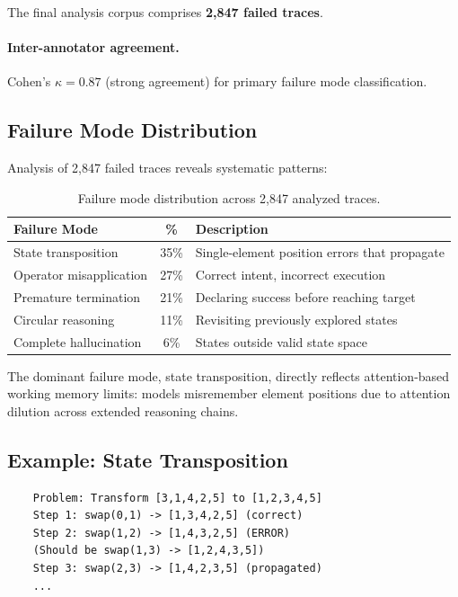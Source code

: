 \documentclass{article}
\theoremstyle{plain}
\theoremstyle{definition}
\theoremstyle{remark}
\begin{document}
The final analysis corpus comprises \textbf{2,847 failed traces}.

\paragraph{Inter-annotator agreement.} Cohen's $\kappa = 0.87$ (strong agreement) for primary failure mode classification.

\subsection{Failure Mode Distribution}

Analysis of 2,847 failed traces reveals systematic patterns:

\begin{table}[h]
	\centering
	\caption{Failure mode distribution across 2,847 analyzed traces.}
	\label{tab:failure_modes}
	\small
	\begin{tabular}{@{}lcp{5.5cm}@{}}
		\toprule
		\textbf{Failure Mode} & \textbf{\%} & \textbf{Description} \\
		\midrule
		State transposition & 35\% & Single-element position errors that propagate \\
		Operator misapplication & 27\% & Correct intent, incorrect execution \\
		Premature termination & 21\% & Declaring success before reaching target \\
		Circular reasoning & 11\% & Revisiting previously explored states \\
		Complete hallucination & 6\% & States outside valid state space \\
		\bottomrule
	\end{tabular}
\end{table}

The dominant failure mode, state transposition, directly reflects attention-based working memory limits: models misremember element positions due to attention dilution across extended reasoning chains.

\subsection{Example: State Transposition}

\begin{verbatim}
	Problem: Transform [3,1,4,2,5] to [1,2,3,4,5]
	Step 1: swap(0,1) -> [1,3,4,2,5] (correct)
	Step 2: swap(1,2) -> [1,4,3,2,5] (ERROR)
	(Should be swap(1,3) -> [1,2,4,3,5])
	Step 3: swap(2,3) -> [1,4,2,3,5] (propagated)
	...
\end{verbatim}
\end{document}

